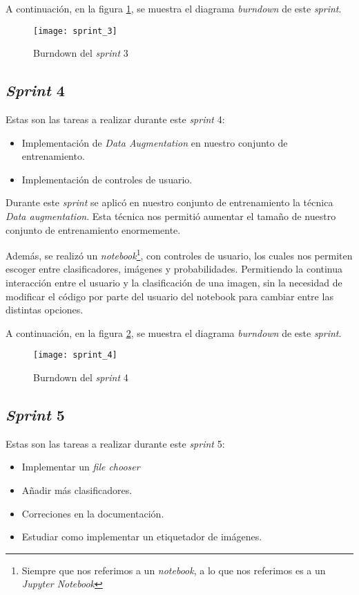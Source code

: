 A continuación, en la figura \ref{fig:A.1.4}, se muestra el diagrama \textit{burndown} de este \textit{sprint}.

\begin{figure}[h]
\centering
\texttt{[image: sprint\_3]}
\caption{Burndown del \textit{sprint} 3}
\label{fig:A.1.4}
\end{figure}

\subsection{\textit{Sprint} 4}
Estas son las tareas a realizar durante este \textit{sprint} 4:

\begin{itemize}
	\item Implementación de \textit{Data Augmentation} en nuestro conjunto de entrenamiento.
	\item Implementación de controles de usuario.
\end{itemize}

Durante este \textit{sprint} se aplicó en nuestro conjunto de entrenamiento la técnica \textit{Data augmentation}. Esta técnica nos permitió aumentar el tamaño de nuestro conjunto de entrenamiento enormemente. 

Además, se realizó un \textit{notebook}\footnote{Siempre que nos referimos a un \textit{notebook}, a lo que nos referimos es a un \textit{Jupyter Notebook}}, con controles de usuario, los cuales nos permiten escoger entre clasificadores, imágenes y probabilidades. Permitiendo la continua interacción entre el usuario y la clasificación de una imagen, sin la necesidad de modificar el código por parte del usuario del notebook para cambiar entre las distintas opciones.

A continuación, en la figura \ref{fig:A.1.5}, se muestra el diagrama \textit{burndown} de este \textit{sprint}.

\begin{figure}[h]
\centering
\texttt{[image: sprint\_4]}
\caption{Burndown del \textit{sprint} 4}
\label{fig:A.1.5}
\end{figure}


\subsection{\textit{Sprint} 5}
Estas son las tareas a realizar durante este \textit{sprint} 5:

\begin{itemize}
	\item Implementar un \textit{file chooser} 
	\item Añadir más clasificadores.
	\item Correciones en la documentación.
	\item Estudiar como implementar un etiquetador de imágenes.
\end{itemize}

